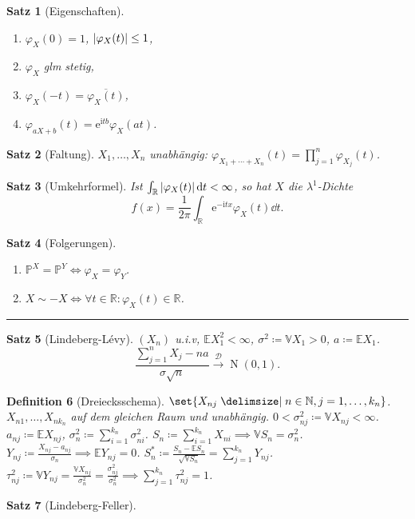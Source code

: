 \documentclass[a4paper,8pt]{article}
\newcounter{Sec}
\theoremstyle{nonumberbreak}
\newtheorem{definition}{Definition}[Sec]
\newtheorem{satz}[definition]{Satz}
\newcommand{\sep}{%
	\rule{\linewidth}{0.15pt}%
	\stepcounter{Sec}%
	}
\newcommand{\defas}{\coloneqq}
\DeclareMathOperator{\Nd}{N}
\newcommand{\conj}{\overline}
\renewcommand{\P}{\mathbb{P}}
\newcommand{\R}{\mathbb{R}}
\newcommand{\E}{\mathbb{E}}
\newcommand{\V}{\mathbb{V}}
\newcommand{\N}{\mathbb{N}}
\newcommand{\cf}{\varphi}
\newcommand{\e}{\mathrm{e}}
\renewcommand{\i}{\mathrm{i}}
\newcommand{\vk}{\mathrel{\stackrel{\mathcal{D}}{\longrightarrow}}}
\begin{document}
\begin{multicols}{3}
\begin{satz}[Eigenschaften]
		{\setlength{\columnseprule}{0pt}\begin{multicols}{2}
		\begin{enumerate}[label=(\alph*)]
			\item $\cf_X(0)=1$, $\abs{\cf_X(t)}\leq 1$,
			\item $\cf_X$ glm stetig,
			\item $\cf_X(-t) = \conj{\cf_X(t)}$,
			\item $\cf_{aX+b}(t) = \e^{\i tb}\cf_X(at)$.
		\end{enumerate}
		\end{multicols}}
	\end{satz}
	\begin{satz}[Faltung]
		$X_1,\ldots,X_n$ unabhängig: $\cf_{X_1+\cdots+X_n}(t)=\prod_{j=1}^n\cf_{X_j}(t)$.
	\end{satz}
	\begin{satz}[Umkehrformel]
		Ist $\int_\R\abs{\cf_X(t)}\dd{t}<\infty$, so hat $X$ die
		$\lambda^1$-Dichte \[f(x) = \frac{1}{2\pi}\int_\R\e^{-\i tx}\cf_X(t)\dd{t}.\]
	\end{satz}
	\begin{satz}[Folgerungen]
		\begin{enumerate}[label=(\alph*)]
			\item $\P^X=\P^Y\iff\cf_X=\cf_Y$.
			\item $X\sim -X\iff \forall t\in\R:\cf_X(t)\in\R$.
		\end{enumerate}
	\end{satz}
	\sep
	\begin{satz}[Lindeberg-Lévy]
		$(X_n)$ u.i.v, $\E X_1^2<\infty$, $\sigma^2\defas \V X_1>0$, $a\defas \E X_1$.
		\[
			\frac{\sum_{j=1}^nX_j - na}{\sigma\sqrt{n}}\vk \Nd(0, 1).
		\]
	\end{satz}
	\begin{definition}[Dreiecksschema] %
		$\set{X_{nj}\given n\in\N, j=1,\ldots,k_n}$. $X_{n1},\ldots,X_{nk_n}$ auf dem
		gleichen Raum und unabhängig. $0<\sigma_{nj}^2\defas \V X_{nj}<\infty$.
		$a_{nj}\defas \E X_{nj}$, $\sigma_n^2\defas\sum_{i=1}^{k_n}\sigma_{ni}^2$.
		$S_n\defas\sum_{i=1}^{k_n}X_{ni}\implies \V S_n=\sigma_n^2$.
		$Y_{nj}\defas\frac{X_{nj}-a_{nj}}{\sigma_n}\implies \E Y_{nj}=0$.
		$S_n^*\defas\frac{S_n-\E S_n}{\sqrt{\V S_n}} = \sum_{j=1}^{k_n} Y_{nj}$.
		$\tau_{nj}^2\defas \V Y_{nj} = \frac{\V X_{nj}}{\sigma_n^2}=\frac{\sigma_{nj}^2}{\sigma_n^2}
		\implies \sum_{j=1}^{k_n}\tau_{nj}^2=1$.
	\end{definition}
	\begin{satz}[Lindeberg-Feller]

\end{satz}
\end{multicols}
\end{document}
